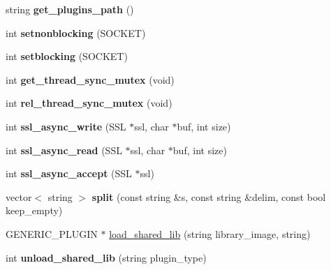 \begin{DoxyCompactItemize}
\item 
\hypertarget{classgeneric__server_ac0bd385f3afb4efcca7f7af58f3701d8}{string {\bfseries get\-\_\-plugins\-\_\-path} ()}\label{classgeneric__server_ac0bd385f3afb4efcca7f7af58f3701d8}

\item 
\hypertarget{classgeneric__server_af46c85ae0a66c174e5848b007aab7747}{int {\bfseries setnonblocking} (S\-O\-C\-K\-E\-T)}\label{classgeneric__server_af46c85ae0a66c174e5848b007aab7747}

\item 
\hypertarget{classgeneric__server_a0656a870b6af646fa123c1d10033364f}{int {\bfseries setblocking} (S\-O\-C\-K\-E\-T)}\label{classgeneric__server_a0656a870b6af646fa123c1d10033364f}

\item 
\hypertarget{classgeneric__server_a3f01d821d7032b872f38b0490f1db0a0}{int {\bfseries get\-\_\-thread\-\_\-sync\-\_\-mutex} (void)}\label{classgeneric__server_a3f01d821d7032b872f38b0490f1db0a0}

\item 
\hypertarget{classgeneric__server_ab35fc0a3a707d6aa4c9b283077e93841}{int {\bfseries rel\-\_\-thread\-\_\-sync\-\_\-mutex} (void)}\label{classgeneric__server_ab35fc0a3a707d6aa4c9b283077e93841}

\item 
\hypertarget{classgeneric__server_a8965fce22c7adf4463d97a2e795cb8f1}{int {\bfseries ssl\-\_\-async\-\_\-write} (S\-S\-L $\ast$ssl, char $\ast$buf, int size)}\label{classgeneric__server_a8965fce22c7adf4463d97a2e795cb8f1}

\item 
\hypertarget{classgeneric__server_a8024f37d4850f8377ffda6e4feab58f9}{int {\bfseries ssl\-\_\-async\-\_\-read} (S\-S\-L $\ast$ssl, char $\ast$buf, int size)}\label{classgeneric__server_a8024f37d4850f8377ffda6e4feab58f9}

\item 
\hypertarget{classgeneric__server_a8bff8579270ef1ef208c72a9740cdceb}{int {\bfseries ssl\-\_\-async\-\_\-accept} (S\-S\-L $\ast$ssl)}\label{classgeneric__server_a8bff8579270ef1ef208c72a9740cdceb}

\item 
\hypertarget{classgeneric__server_a7235399526ad0719d80c3ecc6da52cc8}{vector$<$ string $>$ {\bfseries split} (const string \&s, const string \&delim, const bool keep\-\_\-empty)}\label{classgeneric__server_a7235399526ad0719d80c3ecc6da52cc8}

\item 
G\-E\-N\-E\-R\-I\-C\-\_\-\-P\-L\-U\-G\-I\-N $\ast$ \hyperlink{classgeneric__server_a243ee0c97048a292a8fda0ab3d5217e0}{load\-\_\-shared\-\_\-lib} (string library\-\_\-image, string)
\item 
\hypertarget{classgeneric__server_aa943a01de47df0131024fd2ee615f4b0}{int {\bfseries unload\-\_\-shared\-\_\-lib} (string plugin\-\_\-type)}\label{classgeneric__server_aa943a01de47df0131024fd2ee615f4b0}


\end{DoxyCompactItemize}
